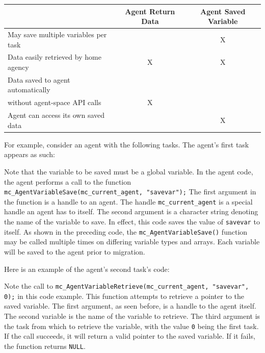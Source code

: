 \documentclass[11pt]{report}
\begin{document}
\begin{tabular}{l|cc}
 & Agent Return Data & Agent Saved Variable \\
\hline
May save multiple variables per task & & X \\
\hline
Data easily retrieved by home agency & X & X \\
\hline
Data saved to agent automatically  & & \\
without agent-space API calls & X & \\
\hline
Agent can access its own saved data & & X
\end{tabular}

\vspace{0.18in}
For example, consider an agent with the following tasks. The agent's first task
appears as such:

Note that the variable to be saved must be a global variable. In the agent code, the agent
performs a call to the function \texttt{mc\_AgentVariableSave(mc\_current\_agent, "savevar");}
The first argument in the function is a handle to an agent. The handle \texttt{mc\_current\_agent} is
a special handle an agent has to itself. The second argument is a character string denoting the
name of the variable to save. In effect, this code saves the value of \texttt{savevar} to
itself. As shown in the preceding code, the \texttt{mc\_AgentVariableSave()} function may
be called multiple times on differing variable types and arrays. Each variable will be
saved to the agent prior to migration.

Here is an example of the agent's second task's code:

Note the call to \texttt{mc\_AgentVariableRetrieve(mc\_current\_agent,
"savevar", 0);} in this code example. This function attempts to retrieve a
pointer to the saved variable. The first argument, as seen before, is a handle
to the agent itself. The second variable is the name of the variable to
retrieve. The third argument is the task from which to retrieve the variable,
with the value \texttt{0} being the first task. If the call succeeds, it will
return a valid pointer to the saved variable. If it fails, the function returns
\texttt{NULL}.





\end{document}
